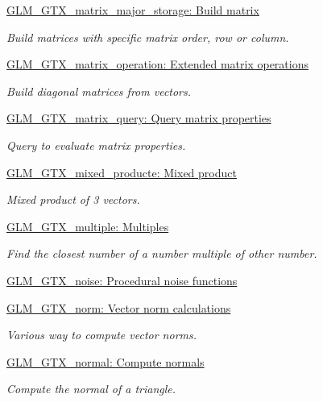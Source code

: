 \begin{DoxyCompactItemize}
\hyperlink{group__gtx__matrix__major__storage}{\-G\-L\-M\-\_\-\-G\-T\-X\-\_\-matrix\-\_\-major\-\_\-storage\-: Build matrix}
\begin{DoxyCompactList}\small\item\em \-Build matrices with specific matrix order, row or column. \end{DoxyCompactList}\item 
\hyperlink{group__gtx__matrix__operation}{\-G\-L\-M\-\_\-\-G\-T\-X\-\_\-matrix\-\_\-operation\-: Extended matrix operations}
\begin{DoxyCompactList}\small\item\em \-Build diagonal matrices from vectors. \end{DoxyCompactList}\item 
\hyperlink{group__gtx__matrix__query}{\-G\-L\-M\-\_\-\-G\-T\-X\-\_\-matrix\-\_\-query\-: Query matrix properties}
\begin{DoxyCompactList}\small\item\em \-Query to evaluate matrix properties. \end{DoxyCompactList}\item 
\hyperlink{group__gtx__mixed__product}{\-G\-L\-M\-\_\-\-G\-T\-X\-\_\-mixed\-\_\-producte\-: Mixed product}
\begin{DoxyCompactList}\small\item\em \-Mixed product of 3 vectors. \end{DoxyCompactList}\item 
\hyperlink{group__gtx__multiple}{\-G\-L\-M\-\_\-\-G\-T\-X\-\_\-multiple\-: Multiples}
\begin{DoxyCompactList}\small\item\em \-Find the closest number of a number multiple of other number. \end{DoxyCompactList}\item 
\hyperlink{group__gtx__noise}{\-G\-L\-M\-\_\-\-G\-T\-X\-\_\-noise\-: Procedural noise functions}
\item 
\hyperlink{group__gtx__norm}{\-G\-L\-M\-\_\-\-G\-T\-X\-\_\-norm\-: Vector norm calculations}
\begin{DoxyCompactList}\small\item\em \-Various way to compute vector norms. \end{DoxyCompactList}\item 
\hyperlink{group__gtx__normal}{\-G\-L\-M\-\_\-\-G\-T\-X\-\_\-normal\-: Compute normals}
\begin{DoxyCompactList}\small\item\em \-Compute the normal of a triangle. \end{DoxyCompactList}\item 

\end{DoxyCompactItemize}
